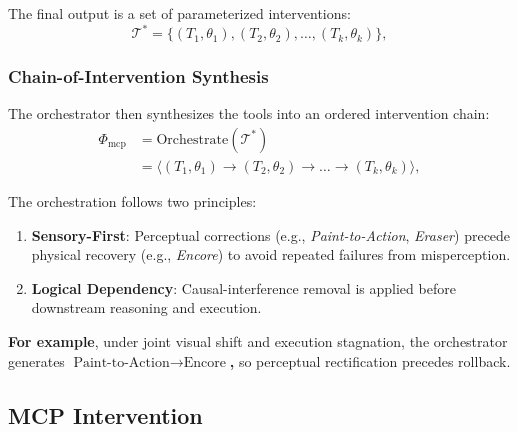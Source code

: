 The final output is a set of parameterized interventions:
\begin{equation}
\mathcal{T}^* = \{(T_1, \theta_1), (T_2, \theta_2), \dots, (T_k, \theta_k)\},
\end{equation}


\subsubsection{Chain-of-Intervention Synthesis}


The {\color{black}orchestrator} then synthesizes the tools into an ordered intervention chain:
\begin{equation}
\begin{aligned}
\Phi_{\text{mcp}} &= \text{Orchestrate}(\mathcal{T}^*) \\
&= \big\langle (T_1, \theta_1) \rightarrow (T_2, \theta_2) \rightarrow \dots \rightarrow (T_k, \theta_k) \big\rangle,
\end{aligned}
\end{equation}

The orchestration follows two principles:
\begin{enumerate}
    \item \textbf{Sensory-First}: Perceptual corrections (e.g., \textit{Paint-to-Action}, \textit{Eraser}) precede physical recovery (e.g., \textit{Encore}) to avoid repeated failures from misperception.
    \item \textbf{Logical Dependency}: Causal-interference removal is applied before downstream reasoning and execution.
\end{enumerate}

\noindent\textbf{For example}, under joint visual shift and execution stagnation, the {\color{black}orchestrator} generates
\textbf{$\text{Paint-to-Action} \rightarrow \text{Encore}$,}
so perceptual rectification precedes rollback. 

\subsection{MCP Intervention}


